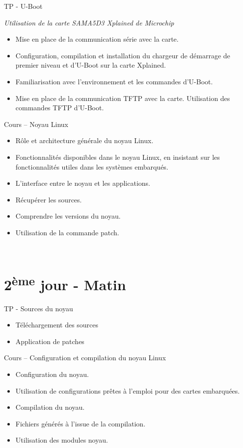 \documentclass[a4paper,12pt,obeyspaces,spaces,hyphens]{article}
\begin{document}
\feagendatwocolumn
{TP - U-Boot}
{
  {\em Utilisation de la carte SAMA5D3 Xplained de Microchip}
  \begin{itemize}
  \item Mise en place de la communication série avec la carte.
  \item Configuration, compilation et installation du chargeur de
	démarrage de premier niveau et d'U-Boot sur la carte Xplained.
  \item Familiarisation avec l'environnement et les commandes d'U-Boot.
  \item Mise en place de la communication TFTP avec la carte.
	Utilisation des commandes TFTP d'U-Boot.
  \end{itemize}
}
{Cours – Noyau Linux}
{
  \begin{itemize}
  \item Rôle et architecture générale du noyau Linux.
  \item Fonctionnalités disponibles dans le noyau Linux, en insistant
	sur les fonctionnalités utiles dans les systèmes embarqués.
  \item L'interface entre le noyau et les applications.
  \item Récupérer les sources.
  \item Comprendre les versions du noyau.
  \item Utilisation de la commande patch.
  \end{itemize}
}
\\

\section{2\textsuperscript{ème} jour - Matin}

\feagendatwocolumn
{TP - Sources du noyau}
{
  \begin{itemize}
  \item Téléchargement des sources
  \item Application de patches
  \end{itemize}
}
{Cours – Configuration et compilation du noyau Linux}
{
  \begin{itemize}
  \item Configuration du noyau.
  \item Utilisation de configurations prêtes à l'emploi pour des cartes embarquées.
  \item Compilation du noyau.
  \item Fichiers générés à l'issue de la compilation.
  \item Utilisation des modules noyau.
  \end{itemize}
}
\end{document}
